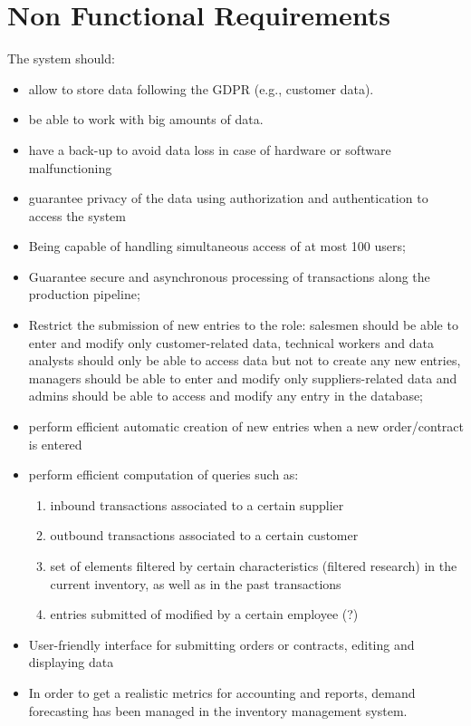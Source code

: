 \section{Non Functional Requirements}
The system should:
\begin{itemize}
    \item allow to store data following the GDPR (e.g., customer data).
    \item be able to work with big amounts of data.
    \item have a back-up to avoid data loss in case of hardware or software malfunctioning
    \item guarantee privacy of the data using authorization and authentication to access the system
    \item Being capable of handling simultaneous access of at most 100 users;
    \item Guarantee secure and asynchronous processing of transactions along the production pipeline;
    \item Restrict the submission of new entries to the role: salesmen should be able to enter and modify only customer-related data, technical workers and data analysts should only be able to access data but not to create any new entries, managers should be able to enter and modify only suppliers-related data and admins should be able to access and modify any entry in the database;
    \item perform efficient automatic creation of new entries when a new order/contract is entered 
    \item perform efficient computation of queries such as:
    \begin{enumerate}
	    \item inbound transactions associated to a certain supplier
	    \item outbound transactions associated to a certain customer
	    \item set of elements filtered by certain characteristics (filtered research) in the current inventory, as well as in the past transactions
   		\item entries submitted of modified by a certain employee (?)
    \end{enumerate}
    \item User-friendly interface for submitting orders or contracts, editing and displaying data
    \item In order to get a realistic metrics for accounting and reports, demand forecasting has been managed in the inventory management system.
\end{itemize}

